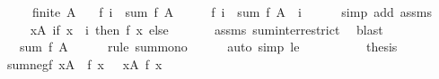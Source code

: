 \begin{isabellebody}
\ \ \ \ \ {\isachardoublequoteopen}finite\ A{\isachardoublequoteclose}\isanewline
\ \ \ {\isachardoublequoteopen}f\ i\ {\isasymle}\ sum\ f\ A{\isachardoublequoteclose}\isanewline
%
\isadelimproof
%
\endisadelimproof
%
\isatagproof
{}\isamarkupfalse%
\ {\isacharminus}{\kern0pt}\isanewline
\ \ \isamarkupfalse%
\ {\isachardoublequoteopen}f\ i\ {\isasymle}\ sum\ f\ {\isacharparenleft}{\kern0pt}A\ {\isasyminter}\ {\isacharbraceleft}{\kern0pt}i{\isacharbraceright}{\kern0pt}{\isacharparenright}{\kern0pt}{\isachardoublequoteclose}\isanewline
\ \ \ \ \isamarkupfalse%
\ {\isacharparenleft}{\kern0pt}simp\ add{\isacharcolon}{\kern0pt}\ assms{\isacharparenright}{\kern0pt}\isanewline
\ \ \isamarkupfalse%
\ \isamarkupfalse%
\ {\isachardoublequoteopen}{\isachardot}{\kern0pt}{\isachardot}{\kern0pt}{\isachardot}{\kern0pt}\ {\isacharequal}{\kern0pt}\ {\isacharparenleft}{\kern0pt}{\isasymSum}x{\isasymin}A{\isachardot}{\kern0pt}\ if\ x\ {\isasymin}\ {\isacharbraceleft}{\kern0pt}i{\isacharbraceright}{\kern0pt}\ then\ f\ x\ else\ {}{\isacharparenright}{\kern0pt}{\isachardoublequoteclose}\isanewline
\ \ \ \ \isamarkupfalse%
\ assms\ sum{\isachardot}{\kern0pt}inter{\isacharunderscore}{\kern0pt}restrict\ \isamarkupfalse%
\ blast\isanewline
\ \ \isamarkupfalse%
\ \isamarkupfalse%
\ {\isachardoublequoteopen}{\isachardot}{\kern0pt}{\isachardot}{\kern0pt}{\isachardot}{\kern0pt}\ {\isasymle}\ sum\ f\ A{\isachardoublequoteclose}\isanewline
\ \ \ \ \isamarkupfalse%
\ {\isacharparenleft}{\kern0pt}rule\ sum{\isacharunderscore}{\kern0pt}mono{\isacharparenright}{\kern0pt}\isanewline
\ \ \ \ \isamarkupfalse%
\ {\isacharparenleft}{\kern0pt}auto\ simp{\isacharcolon}{\kern0pt}\ le{\isacharparenright}{\kern0pt}\isanewline
\ \ \ \ \isamarkupfalse%
\isanewline
\ \ \isamarkupfalse%
\ \isamarkupfalse%
\ {\isacharquery}{\kern0pt}thesis\ \isacommand{{\isachardot}{\kern0pt}}\isamarkupfalse%
\isanewline
{}\isamarkupfalse%
%
\endisatagproof
{\isafoldproof}%
%
\isadelimproof
\isanewline
%
\endisadelimproof
\isanewline
{}\isamarkupfalse%
\ sum{\isacharunderscore}{\kern0pt}negf{\isacharcolon}{\kern0pt}\ {\isachardoublequoteopen}{\isacharparenleft}{\kern0pt}{\isasymSum}x{\isasymin}A{\isachardot}{\kern0pt}\ {\isacharminus}{\kern0pt}\ f\ x{\isacharparenright}{\kern0pt}\ {\isacharequal}{\kern0pt}\ {\isacharminus}{\kern0pt}\ {\isacharparenleft}{\kern0pt}{\isasymSum}x{\isasymin}A{\isachardot}{\kern0pt}\ f\ x{\isacharparenright}{\kern0pt}{\isachardoublequoteclose}\isanewline

\end{isabellebody}

